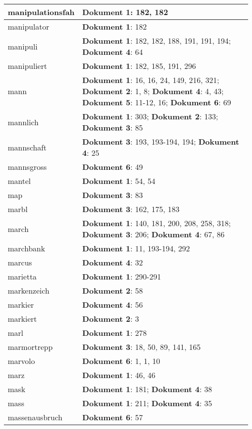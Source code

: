\documentclass[a5paper]{article}
\begin{document}
\begin{longtable}[l]{|l|p{3in}|}
\hline
manipulationsfah & \textbf{Dokument 1}: 182, 182 \\
\hline
manipulator & \textbf{Dokument 1}: 182 \\
\hline
manipuli & \textbf{Dokument 1}: 182, 182, 188, 191, 191, 194; \textbf{Dokument 4}: 64 \\
\hline
manipuliert & \textbf{Dokument 1}: 182, 185, 191, 296 \\
\hline
mann & \textbf{Dokument 1}: 16, 16, 24, 149, 216, 321; \textbf{Dokument 2}: 1, 8; \textbf{Dokument 4}: 4, 43; \textbf{Dokument 5}: 11-12, 16; \textbf{Dokument 6}: 69 \\
\hline
mannlich & \textbf{Dokument 1}: 303; \textbf{Dokument 2}: 133; \textbf{Dokument 3}: 85 \\
\hline
mannschaft & \textbf{Dokument 3}: 193, 193-194, 194; \textbf{Dokument 4}: 25 \\
\hline
mannsgross & \textbf{Dokument 6}: 49 \\
\hline
mantel & \textbf{Dokument 1}: 54, 54 \\
\hline
map & \textbf{Dokument 3}: 83 \\
\hline
marbl & \textbf{Dokument 3}: 162, 175, 183 \\
\hline
march & \textbf{Dokument 1}: 140, 181, 200, 208, 258, 318; \textbf{Dokument 3}: 206; \textbf{Dokument 4}: 67, 86 \\
\hline
marchbank & \textbf{Dokument 1}: 11, 193-194, 292 \\
\hline
marcus & \textbf{Dokument 4}: 32 \\
\hline
marietta & \textbf{Dokument 1}: 290-291 \\
\hline
markenzeich & \textbf{Dokument 2}: 58 \\
\hline
markier & \textbf{Dokument 4}: 56 \\
\hline
markiert & \textbf{Dokument 2}: 3 \\
\hline
marl & \textbf{Dokument 1}: 278 \\
\hline
marmortrepp & \textbf{Dokument 3}: 18, 50, 89, 141, 165 \\
\hline
marvolo & \textbf{Dokument 6}: 1, 1, 10 \\
\hline
marz & \textbf{Dokument 1}: 46, 46 \\
\hline
mask & \textbf{Dokument 1}: 181; \textbf{Dokument 4}: 38 \\
\hline
mass & \textbf{Dokument 1}: 211; \textbf{Dokument 4}: 35 \\
\hline
massenausbruch & \textbf{Dokument 6}: 57 \\

\end{longtable}
\end{document}
